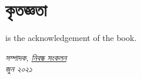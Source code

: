 		\section*{কৃতজ্ঞতা}
		 is the acknowledgement of the book.
		\blindtext \\

		\begin{flushright}
		\itshape
		সম্পাদক, \href{<url>}{নিবন্ধ সংকলন} \\ জুন ২০২১
		\end{flushright}

\cleardoublepage

\setcounter{tocdepth}{0}
\tableofcontents

\newpage
\pagestyle{plain}
